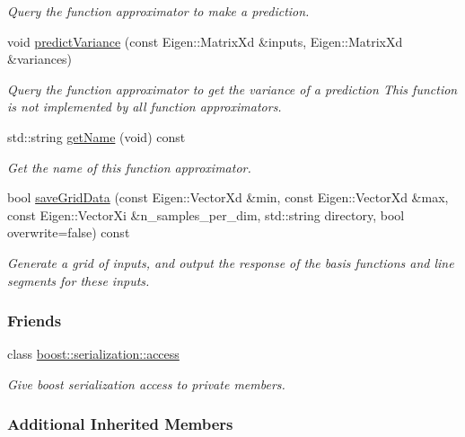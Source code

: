 \begin{DoxyCompactItemize}
\begin{DoxyCompactList}\small\item\em Query the function approximator to make a prediction. \end{DoxyCompactList}\item 
void \hyperlink{classDmpBbo_1_1FunctionApproximatorGPR_a81bcaa6c544bee98c1c625c81860fe4c}{predict\+Variance} (const Eigen\+::\+Matrix\+Xd \&inputs, Eigen\+::\+Matrix\+Xd \&variances)
\begin{DoxyCompactList}\small\item\em Query the function approximator to get the variance of a prediction This function is not implemented by all function approximators. \end{DoxyCompactList}\item 
std\+::string \hyperlink{classDmpBbo_1_1FunctionApproximatorGPR_ad4c95407e44ba3e16b9651f9b81cd0e6}{get\+Name} (void) const 
\begin{DoxyCompactList}\small\item\em Get the name of this function approximator. \end{DoxyCompactList}\item 
bool \hyperlink{classDmpBbo_1_1FunctionApproximatorGPR_a53d95f63de3b49491b1204f45a24ae25}{save\+Grid\+Data} (const Eigen\+::\+Vector\+Xd \&min, const Eigen\+::\+Vector\+Xd \&max, const Eigen\+::\+Vector\+Xi \&n\+\_\+samples\+\_\+per\+\_\+dim, std\+::string directory, bool overwrite=false) const 
\begin{DoxyCompactList}\small\item\em Generate a grid of inputs, and output the response of the basis functions and line segments for these inputs. \end{DoxyCompactList}\end{DoxyCompactItemize}
\subsubsection*{Friends}
\begin{DoxyCompactItemize}
\item 
class \hyperlink{classDmpBbo_1_1FunctionApproximatorGPR_ac98d07dd8f7b70e16ccb9a01abf56b9c}{boost\+::serialization\+::access}
\begin{DoxyCompactList}\small\item\em Give boost serialization access to private members. \end{DoxyCompactList}\end{DoxyCompactItemize}
\subsubsection*{Additional Inherited Members}



